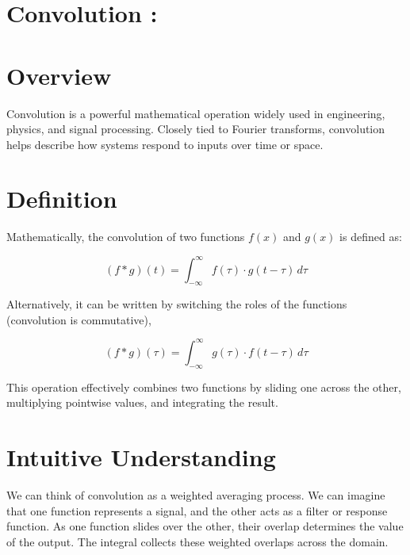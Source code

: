 \documentclass[12pt,a4paper]{report}
\begin{document}
\begin{center}
 


\end{center}
\section{Convolution :}
\section*{Overview}

Convolution is a powerful mathematical operation widely used in engineering, physics, and signal processing. Closely tied to Fourier transforms, convolution helps describe how systems respond to inputs over time or space.

\section*{Definition}

Mathematically, the convolution of two functions \( f(x) \) and \( g(x) \) is defined as:

\[
(f * g)(t) = \int_{-\infty}^{\infty} f(\tau) \cdot g(t - \tau) \, d\tau
\]

Alternatively, it can be written by switching the roles of the functions (convolution is commutative),

\[
(f * g)(\tau) = \int_{-\infty}^{\infty} g(\tau) \cdot f(t - \tau) \, d\tau
\]

This operation effectively combines two functions by sliding one across the other, multiplying pointwise values, and integrating the result.
\section*{Intuitive Understanding}

We can think of convolution as a weighted averaging process. We can imagine that one function represents a signal, and the other acts as a filter or response function. As one function slides over the other, their overlap determines the value of the output. The integral collects these weighted overlaps across the domain.
\end{document}
